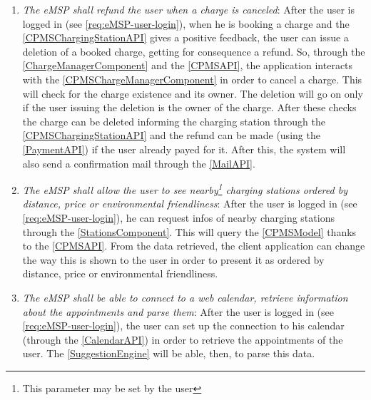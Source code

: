 \begin{enumerate}[label=\textbf{R\arabic*}]
          \label{req:eMSP-payment}
    \item \textit{The \ac{eMSP} shall refund the user when a charge is canceled}:
          After the user is logged in (see \ref{req:eMSP-user-login}), when he is booking a charge and the \ref{CPMSChargingStationAPI} gives a positive feedback, the user can issue a deletion of a booked charge, getting for consequence a refund.
          So, through the \ref{ChargeManagerComponent} and the \ref{CPMSAPI}, the application interacts with the \ref{CPMSChargeManagerComponent} in order to cancel a charge. This will check for the charge existence and its owner. The deletion will go on only if the user issuing the deletion is the owner of the charge.
          After these checks the charge can be deleted informing the charging station through the \ref{CPMSChargingStationAPI} and the refund can be made (using the \ref{PaymentAPI}) if the user already payed for it.
          After this, the system will also send a confirmation mail through the \ref{MailAPI}.
          \label{req:eMSP-refund}
    \item \textit{The \ac{eMSP} shall allow the user to see nearby\footnote{This parameter may be set by the user} charging stations ordered by distance, price or environmental friendliness}:
          After the user is logged in (see \ref{req:eMSP-user-login}), he can request infos of nearby charging stations through the \ref{StationsComponent}. This will query the \ref{CPMSModel} thanks to the \ref{CPMSAPI}. From the data retrieved, the client application can change the way this is shown to the user in order to present it as ordered by distance, price or environmental friendliness.
          \label{req:eMSP-see-stations}
    \item \textit{The \ac{eMSP} shall be able to connect to a web calendar, retrieve information about the appointments and parse them}:
          After the user is logged in (see \ref{req:eMSP-user-login}), the user can set up the connection to his calendar (through the \ref{CalendarAPI}) in order to retrieve the appointments of the user. The \ref{SuggestionEngine} will be able, then, to parse this data.

\end{enumerate}
